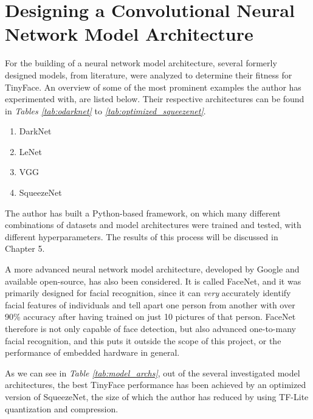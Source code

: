 \newpage
\section{Designing a Convolutional Neural Network Model Architecture}
For the building of a neural network model architecture, several formerly designed models, from literature, were analyzed to determine their fitness for TinyFace. An overview of some of the most prominent examples the author has experimented with, are listed below. Their respective architectures can be found in \textit{Tables \ref{tab:odarknet}} to \textit{\ref{tab:optimized_squeezenet}}.
\begin{enumerate}
    \item DarkNet \cite{tiny_darknet}
    \item LeNet \cite{lenet_1}
    \item VGG \cite{vgg_paper}
    \item SqueezeNet \cite{squeezent_paper}
\end{enumerate}

The author has built a Python-based framework, on which many different combinations of datasets and model architectures were trained and tested, with different hyperparameters. The results of this process will be discussed in Chapter 5. \par
A more advanced neural network model architecture, developed by Google and available open-source, has also been considered. It is called FaceNet, and it was primarily designed for facial recognition, since it can \textit{very} accurately identify facial features of individuals and tell apart one person from another with over 90\% accuracy after having trained on just 10 pictures of that person. FaceNet therefore is not only capable of face detection, but also advanced one-to-many facial recognition, and this puts it outside the scope of this project, or the performance of embedded hardware in general. \cite{facenetseminal_paper} \par
As we can see in \textit{Table \ref{tab:model_archs}}, out of the several investigated model architectures, the best TinyFace performance has been achieved by an optimized version of SqueezeNet, the size of which the author has reduced by using TF-Lite quantization and compression.


\newpage
